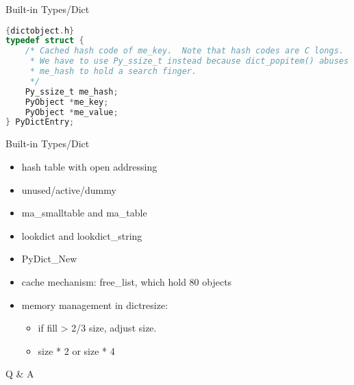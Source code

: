 \documentclass[xcolor=svgnames]{beamer}
\begin{document}
\begin{frame}[fragile]{Built-in Types/Dict}
\begin{lstlisting}[language=C]{dictobject.h}
typedef struct {
    /* Cached hash code of me_key.  Note that hash codes are C longs.
     * We have to use Py_ssize_t instead because dict_popitem() abuses
     * me_hash to hold a search finger.
     */
    Py_ssize_t me_hash;
    PyObject *me_key;
    PyObject *me_value;
} PyDictEntry;
\end{lstlisting} 
\end{frame}

\begin{frame}{Built-in Types/Dict}
\begin{itemize} 
  \item hash table with open addressing
  \item unused/active/dummy
  \item ma\_smalltable and ma\_table
  \item lookdict and lookdict\_string
  \item PyDict\_New
  \item cache mechanism: free\_list, which hold 80 objects
  \item memory management in dictresize:
    \begin{itemize} 
        \item if fill > 2/3 size, adjust size.
        \item size * 2 or size * 4
    \end{itemize} 
\end{itemize} 
\end{frame}

\begin{frame}[c]{} %
    \begin{center}\Huge
        Q \& A
    \end{center}
\end{frame} 
\end{document}
